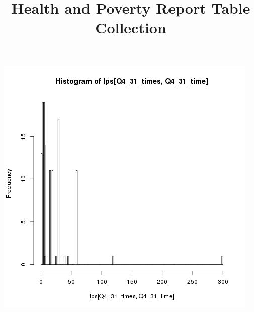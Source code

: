 \documentclass[]{article}
\title{Health and Poverty Report Table Collection}
\author{}
\begin{document}
\maketitle 












\includegraphics[width=0.7\linewidth]{Q4_31_waittimes}










\end{document}
